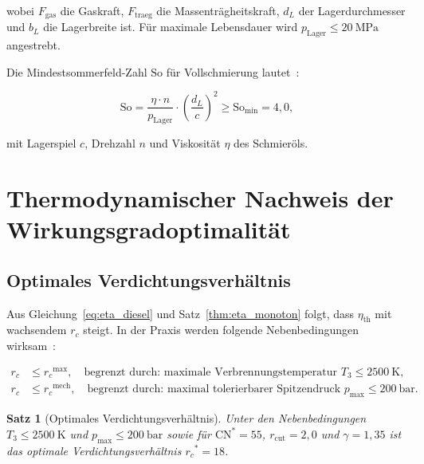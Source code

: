 ﻿\documentclass[12pt,a4paper]{article}
\newtheorem{theorem}{Satz}[section]
\newcommand{\CN}{\ensuremath{\mathrm{CN}}}
\newcommand{\etath}{\ensuremath{\eta_{\mathrm{th}}}}
\newcommand{\rc}{\ensuremath{r_c}}
\newcommand{\rcut}{\ensuremath{r_{\mathrm{cut}}}}
\begin{document}
wobei $F_{\mathrm{gas}}$ die Gaskraft, $F_{\mathrm{traeg}}$ die Massenträgheitskraft,
$d_L$ der Lagerdurchmesser und $b_L$ die Lagerbreite ist. Für maximale Lebensdauer
wird $p_{\mathrm{Lager}} \leq \SI{20}{\MPa}$ angestrebt.

Die Mindestsommerfeld-Zahl $\mathrm{So}$ für Vollschmierung lautet~\cite{DIN31651}:

\begin{equation}
  \mathrm{So} = \frac{\eta \cdot n}{p_{\mathrm{Lager}}} \cdot
  \left(\frac{d_L}{c}\right)^2 \geq \mathrm{So}_{\min} = 4{,}0,
  \label{eq:sommerfeld}
\end{equation}

mit Lagerspiel $c$, Drehzahl $n$ und Viskosität $\eta$ des Schmieröls.

\section{Thermodynamischer Nachweis der Wirkungsgradoptimalität}
\label{sec:thermodynamik}

\subsection{Optimales Verdichtungsverhältnis}
\label{sec:thermo_rc_opt}

Aus Gleichung~\eqref{eq:eta_diesel} und Satz~\ref{thm:eta_monoton} folgt,
dass $\etath$ mit wachsendem $\rc$ steigt. In der Praxis werden folgende
Nebenbedingungen wirksam~\cite{mollenhauer2010}:

\begin{align}
  \rc &\leq \rc^{\max},\quad
  \text{begrenzt durch: maximale Verbrennungstemperatur } T_3 \leq \SI{2500}{\K}, \\
  \rc &\leq \rc^{\text{mech}},\quad
  \text{begrenzt durch: maximal tolerierbarer Spitzendruck } p_{\max} \leq \SI{200}{\bar}.
\end{align}

\begin{theorem}[Optimales Verdichtungsverhältnis]
\label{thm:rc_opt}
Unter den Nebenbedingungen $T_3 \leq \SI{2500}{\K}$ und
$p_{\max} \leq \SI{200}{\bar}$ sowie für $\CN^* = 55$,
$\rcut = 2{,}0$ und $\gamma = 1{,}35$ ist das optimale
Verdichtungsverhältnis $\rc^* = 18$.
\end{theorem}
\end{document}
